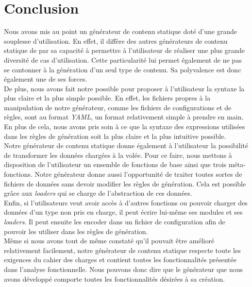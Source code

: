 \section{Conclusion}

	Nous avons mis au point un générateur de contenu statique doté d'une grande souplesse d'utilisation. En effet, il diffère des autres générateurs de contenu statique de par sa capacité à permettre à l'utilisateur de réaliser une plus grande diversité de cas d'utilisation. Cette particularité lui permet également de ne pas se cantonner à la génération d'un seul type de contenu. Sa polyvalence est donc également une de ses forces.\\
	
	De plus, nous avons fait notre possible pour proposer à l'utilisateur la syntaxe la plus claire et la plus simple possible. En effet, les fichiers propres à la manipulation de notre générateur, comme les fichiers de configurations et de règles, sont au format \textit{YAML}, un format relativement simple à prendre en main. En plus de cela, nous avons pris soin à ce que la syntaxe des expressions utilisées dans les règles de génération soit la plus claire et la plus intuitive possible.\\
	
	Notre générateur de contenu statique donne également à l'utilisateur la possibilité de transformer les données chargées à la volée. Pour ce faire, nous mettons à disposition de l'utilisateur un ensemble de fonctions de base ainsi que trois méta-fonctions. Notre générateur donne aussi l'opportunité de traiter toutes sortes de fichiers de données sans devoir modifier les règles de génération. Cela est possible grâce aux \textit{loaders} qui se charge de l'abstraction de ces données.\\
	
	Enfin, si l'utilisateurs veut avoir accès à d'autres fonctions ou pouvoir charger des données d'un type non pris en charge, il peut écrire lui-même ses modules et ses \textit{loaders}. Il peut ensuite les encoder dans un fichier de configuration afin de pouvoir les utiliser dans les règles de génération.\\
	
	Même si nous avons tout de même constaté qu'il pouvait être amélioré relativement facilement, notre générateur de contenu statique respecte toute les exigences du cahier des charges et contient toutes les fonctionnalités présentée dans l'analyse fonctionnelle. Nous pouvons donc dire que le générateur que nous avons développé comporte toutes les fonctionnalités désirées à sa création.
